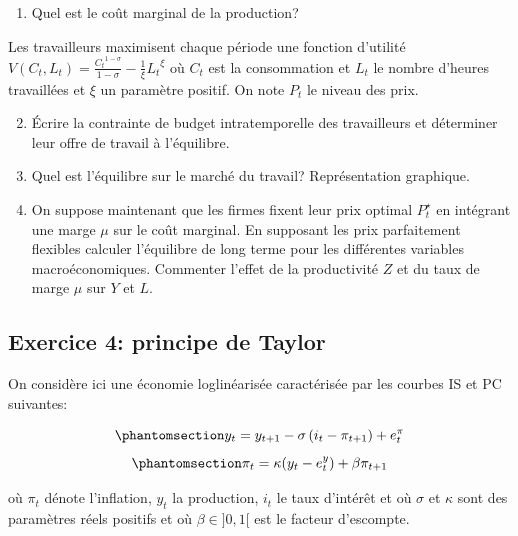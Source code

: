 \documentclass{article}
\begin{document}
\begin{enumerate}
    
\item Quel est le coût marginal de la production?

\end{enumerate}

Les travailleurs maximisent chaque période une fonction d'utilité \(V(C_t,L_t) = \frac{{C_t}^{1-\sigma}}{1-\sigma} - \frac{1}{\xi}{L_t}^{\xi}\)
    où \(C_t\) est la consommation et \(L_t\) le nombre d'heures travaillées  et \(\xi\) un paramètre positif. On note \(P_t\) le niveau des prix.

\begin{enumerate}

\setcounter{enumi}{1}

\item Écrire la contrainte de budget intratemporelle des travailleurs et déterminer leur offre de travail à l'équilibre.
    
\item Quel est l'équilibre sur le marché du travail? Représentation
    graphique.
    
\item On suppose maintenant que les firmes fixent leur prix optimal \(P^{\star}_t\) en intégrant une marge \(\mu\) sur le coût marginal. En supposant les prix parfaitement flexibles calculer l'équilibre de
long terme pour les différentes variables macroéconomiques. Commenter l'effet de la productivité \(Z\) et du taux de marge \(\mu\) sur \(Y\) et \(L\).
    
\end{enumerate}

\hypertarget{exo4}{\subsection{Exercice 4: principe de Taylor}\label{exo4}}


On considère ici une économie loglinéarisée caractérisée par les courbes
IS et PC suivantes:

\begin{equation}\phantomsection\label{eq-is}{y_t = y_{t+1} - \sigma \left( i_t - \pi_{t+1} \right) + e^{\pi}_t}\end{equation}
\begin{equation}\phantomsection\label{eq-pc}{\pi_t = \kappa (y_t - e^y_t)  + \beta \pi_{t+1}}\end{equation}

où \(\pi_t\) dénote l'inflation, \(y_t\) la production, \(i_t\) le taux
d'intérêt et où \(\sigma\) et \(\kappa\) sont des paramètres réels
positifs et où \(\beta \in ]0,1[\) est le facteur d'escompte.
\end{document}
